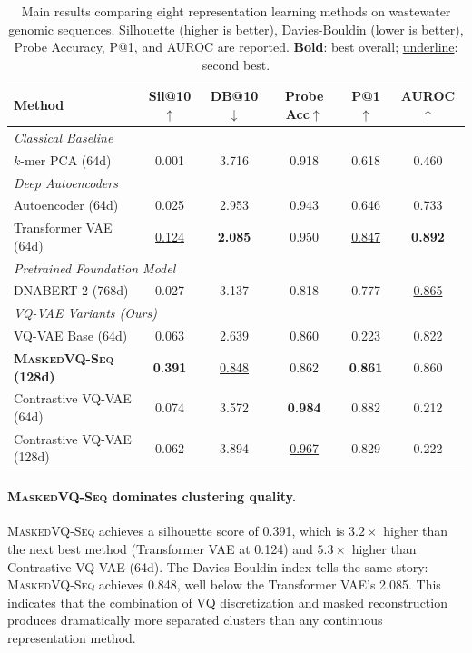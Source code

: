 \documentclass[pmlr]{jmlr}%
\newcommand{\ours}{\textsc{MaskedVQ-Seq}}
\newcommand{\best}[1]{\textbf{#1}}
\newcommand{\second}[1]{\underline{#1}}
\begin{document}
\begin{table}[t]
  \centering
  \caption{Main results comparing eight representation learning methods on wastewater genomic sequences. Silhouette (higher is better), Davies-Bouldin (lower is better), Probe Accuracy, P@1, and AUROC are reported. \textbf{Bold}: best overall; \underline{underline}: second best.}
  \label{tab:main_results}
  \small
  \begin{tabular}{lccccc}
  \toprule
  \textbf{Method} & \textbf{Sil@10$\uparrow$} & \textbf{DB@10$\downarrow$} & \textbf{Probe Acc$\uparrow$} & \textbf{P@1$\uparrow$} & \textbf{AUROC$\uparrow$} \\
  \midrule
  \multicolumn{6}{l}{\textit{Classical Baseline}} \\
  \quad $k$-mer PCA (64d) & 0.001 & 3.716 & 0.918 & 0.618 & 0.460 \\
  \midrule
  \multicolumn{6}{l}{\textit{Deep Autoencoders}} \\
  \quad Autoencoder (64d) & 0.025 & 2.953 & 0.943 & 0.646 & 0.733 \\
  \quad Transformer VAE (64d) & \second{0.124} & \best{2.085} & 0.950 & \second{0.847} & \best{0.892} \\
  \midrule
  \multicolumn{6}{l}{\textit{Pretrained Foundation Model}} \\
  \quad DNABERT-2 (768d) & 0.027 & 3.137 & 0.818 & 0.777 & \second{0.865} \\
  \midrule
  \multicolumn{6}{l}{\textit{VQ-VAE Variants (Ours)}} \\
  \quad VQ-VAE Base (64d) & 0.063 & 2.639 & 0.860 & 0.223 & 0.822 \\
  \quad \textbf{\ours{}} \textbf{(128d)} & \best{0.391} & \second{0.848} & 0.862 & \best{0.861} & 0.860 \\
  \quad Contrastive VQ-VAE (64d) & 0.074 & 3.572 & \best{0.984} & 0.882 & 0.212 \\
  \quad Contrastive VQ-VAE (128d) & 0.062 & 3.894 & \second{0.967} & 0.829 & 0.222 \\
  \bottomrule
  \end{tabular}
\end{table}

\paragraph{\ours{} dominates clustering quality.}
\ours{} achieves a silhouette score of 0.391, which is $3.2\times$ higher than the next best method (Transformer VAE at 0.124) and $5.3\times$ higher than Contrastive VQ-VAE (64d). The Davies-Bouldin index tells the same story: \ours{} achieves 0.848, well below the Transformer VAE's 2.085. This indicates that the combination of VQ discretization and masked reconstruction produces dramatically more separated clusters than any continuous representation method.
\end{document}
